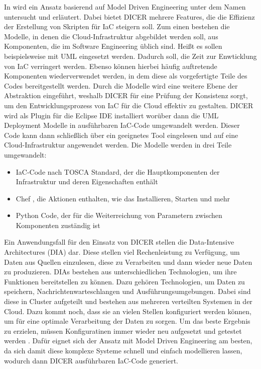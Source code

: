 \documentclass[biblatex]{lni}
\begin{document}
In \cite{Artac.2018} wird ein Ansatz basierend auf Model Driven Engineering unter dem Namen  untersucht und erläutert. Dabei bietet DICER mehrere Features, die die Effizienz der Erstellung von Skripten für IaC steigern soll. Zum einen bestehen die Modelle, in denen die Cloud-Infrastruktur abgebildet werden soll, aus Komponenten, die im Software Engineering üblich sind. Heißt es sollen beispielsweise mit UML  eingesetzt werden. Dadurch soll, die Zeit zur Enwticklung von IaC verringert werden. Ebenso können hierbei häufig auftretende Komponenten wiederverwendet werden, in dem diese als vorgefertigte Teile des Codes bereitgestellt werden. Durch die Modelle wird eine weitere Ebene der Abstraktion eingeführt, weshalb DICER für eine Prüfung der Konsistenz sorgt, um den Entwicklungsprozess von IaC für die Cloud effektiv zu gestalten. DICER wird als Plugin für die Eclipse IDE installiert worüber dann die UML Deployment Modelle in ausführbaren IaC-Code umgewandelt werden. Dieser Code kann dann schließlich über ein geeignetes Tool eingelesen und auf eine Cloud-Infrastruktur angewendet werden. Die Modelle werden in drei Teile umgewandelt:
\begin{itemize}
    \item IaC-Code nach TOSCA Standard, der die Hauptkomponenten der Infrastruktur und deren Eigenschaften enthält
    \item Chef , die Aktionen enthalten, wie das Installieren, Starten und mehr
    \item Python Code, der für die Weiterreichung von Parametern zwischen Komponenten zuständig ist
\end{itemize}

Ein Anwendungsfall für den Einsatz von DICER stellen die Data-Intensive Architectures (DIA) dar. Diese stellen viel Rechenleistung zu Verfügung, um Daten aus Quellen einzulesen, diese zu Verarbeiten und dann wieder neue Daten zu produzieren. DIAs bestehen aus unterschiedlichen Technologien, um ihre Funktionen bereitstellen zu können. Dazu gehören Technologien, um Daten zu speichern, Nachrichtenwarteschlangen und Ausführungsumgebungen. Dabei sind diese in Cluster aufgeteilt und bestehen aus mehreren verteilten Systemen in der Cloud. Dazu kommt noch, dass sie an vielen Stellen konfiguriert werden können, um für eine optimale Verarbeitung der Daten zu sorgen. Um das beste Ergebnis zu erzielen, müssen Konfiguratinen immer wieder neu aufgesetzt und getestet werden \cite{Artac.2018}. Dafür eignet sich der Ansatz mit Model Driven Engineering am besten, da sich damit diese komplexe Systeme schnell und einfach modellieren lassen, wodurch dann DICER ausführbaren IaC-Code generiert.
\end{document}
